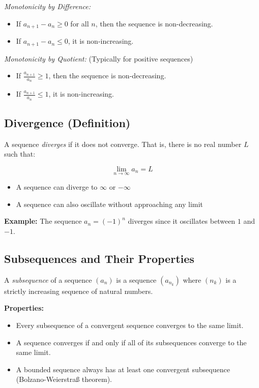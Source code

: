 \emph{Monotonicity by Difference:}
\begin{itemize}[label=\(-\)]
\item If \(a_{n+1} - a_n \ge 0\) for all \(n\), then the sequence is non-decreasing.
\item If \(a_{n+1} - a_n \le 0\), it is non-increasing.
\end{itemize}

\emph{Monotonicity by Quotient:} (Typically for positive sequences)
\begin{itemize}[label=\(-\)]
\item If \(\frac{a_{n+1}}{a_n} \ge 1\), then the sequence is non-decreasing.
\item If \(\frac{a_{n+1}}{a_n} \le 1\), it is non-increasing.
\end{itemize}

\subsection{Divergence (Definition)}

A sequence \emph{diverges} if it does not converge. That is, there is no real number \(L\) such that:

\[
\lim_{n \to \infty} a_n = L
\]

\begin{itemize}[label=\(-\)]
\item A sequence can diverge to \(\infty\) or \(-\infty\)
\item A sequence can also oscillate without approaching any limit
\end{itemize}

\textbf{Example:}
\vspace{\baselineskip}
 The sequence \(a_n = {(-1)}^n\) diverges since it oscillates between \(1\) and \(-1\).


\subsection{Subsequences and Their Properties}

A \emph{subsequence} of a sequence \((a_n)\) is a sequence \((a_{n_k})\) where \((n_k)\) is a strictly increasing sequence of natural numbers.

\textbf{Properties:}
\begin{itemize}[label=\(-\)]
\item Every subsequence of a convergent sequence converges to the same limit.
\item A sequence converges if and only if all of its subsequences converge to the same limit.
\item A bounded sequence always has at least one convergent subsequence (Bolzano-Weierstraß theorem).
\end{itemize}

